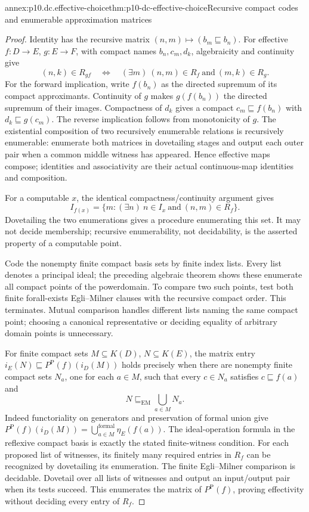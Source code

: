 \begin{annexitem}{annex:p10.dc.effective-choice}{thm:p10-dc-effective-choice}{Recursive compact codes and enumerable approximation matrices}
\begin{proof}
Identity has the recursive matrix \((n,m)\mapsto(b_m\sqsubseteq b_n)\).
For effective \(f:D\to E\), \(g:E\to F\), with compact names
\(b_n,c_m,d_k\), algebraicity and continuity give
\[
 (n,k)\in R_{gf}\quad\Longleftrightarrow\quad
 (\exists m)\ (n,m)\in R_f\ \text{and}\ (m,k)\in R_g.
\]
For the forward implication, write \(f(b_n)\) as the directed supremum
of its compact approximants. Continuity of \(g\) makes \(g(f(b_n))\)
the directed supremum of their images. Compactness of \(d_k\) gives
a compact \(c_m\sqsubseteq f(b_n)\) with \(d_k\sqsubseteq g(c_m)\).
The reverse implication follows from monotonicity of \(g\).
The existential composition of two recursively enumerable relations is
recursively enumerable: enumerate both matrices in dovetailing stages and
output each outer pair when a common middle witness has appeared. Hence
effective maps compose; identities and associativity are their actual
continuous-map identities and composition.

For a computable \(x\), the identical compactness/continuity argument gives
\[
 I_{f(x)}=\{m:(\exists n)\ n\in I_x\ \text{and}\ (n,m)\in R_f\}.
\]
Dovetailing the two enumerations gives a procedure enumerating this set.
It may not decide membership; recursive enumerability, not decidability,
is the asserted property of a computable point.

Code the nonempty finite compact basis sets by finite index lists.
Every list denotes a principal ideal; the preceding algebraic theorem
shows these enumerate all compact points of the powerdomain. To compare
two such points, test both finite forall-exists Egli--Milner clauses with
the recursive compact order. This terminates. Mutual comparison handles
different lists naming the same compact point; choosing a canonical
representative or deciding equality of arbitrary domain points is unnecessary.

For finite compact sets \(M\subseteq K(D)\), \(N\subseteq K(E)\),
the matrix entry
\(i_E(N)\sqsubseteq P^{\mathrm P}(f)(i_D(M))\) holds precisely when
there are nonempty finite compact sets \(N_a\), one for each \(a\in M\),
such that every \(c\in N_a\) satisfies \(c\sqsubseteq f(a)\) and
\[
 N\sqsubseteq_{\mathrm{EM}}\bigcup_{a\in M}N_a.
\]
Indeed functoriality on generators and preservation of formal union give
\(P^{\mathrm P}(f)(i_D(M))=\bigcup_{a\in M}^{\mathrm{formal}}\eta_E(f(a))\).
The ideal-operation formula in the reflexive compact basis is exactly
the stated finite-witness condition. For each proposed list of witnesses,
its finitely many required entries in \(R_f\) can be recognized by
dovetailing its enumeration. The finite Egli--Milner comparison is
decidable. Dovetail over all lists of witnesses and output an input/output
pair when its tests succeed. This enumerates the matrix of \(P^{\mathrm P}(f)\),
proving effectivity without deciding every entry of \(R_f\).


\end{proof}
\end{annexitem}
